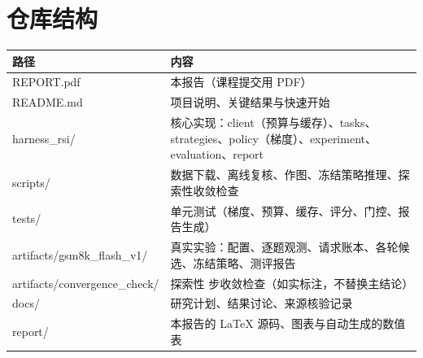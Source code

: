 \documentclass[a4paper,zihao=5,linespread=1.38]{ctexart}
\begin{document}
\section{仓库结构}\label{app:tree}
\begin{table}[H]
\centering\small
\begin{tabularx}{\linewidth}{@{}>{\ttfamily}p{5.0cm}L@{}}
\toprule
路径 & 内容 \\
\midrule
REPORT.pdf & 本报告（课程提交用 PDF） \\
README.md & 项目说明、关键结果与快速开始 \\
harness\_rsi/ & 核心实现：client（预算与缓存）、tasks、strategies、policy（梯度）、experiment、evaluation、report \\
scripts/ & 数据下载、离线复核、作图、冻结策略推理、探索性收敛检查 \\
tests/ & 单元测试（梯度、预算、缓存、评分、门控、报告生成） \\
artifacts/gsm8k\_flash\_v1/ & 真实实验：配置、逐题观测、请求账本、各轮候选、冻结策略、测评报告 \\
artifacts/convergence\_check/ & 探索性 \numConvSteps{} 步收敛检查（如实标注，不替换主结论） \\
docs/ & 研究计划、结果讨论、来源核验记录 \\
report/ & 本报告的 LaTeX 源码、图表与自动生成的数值表 \\
\bottomrule
\end{tabularx}
\end{table}
\end{document}
